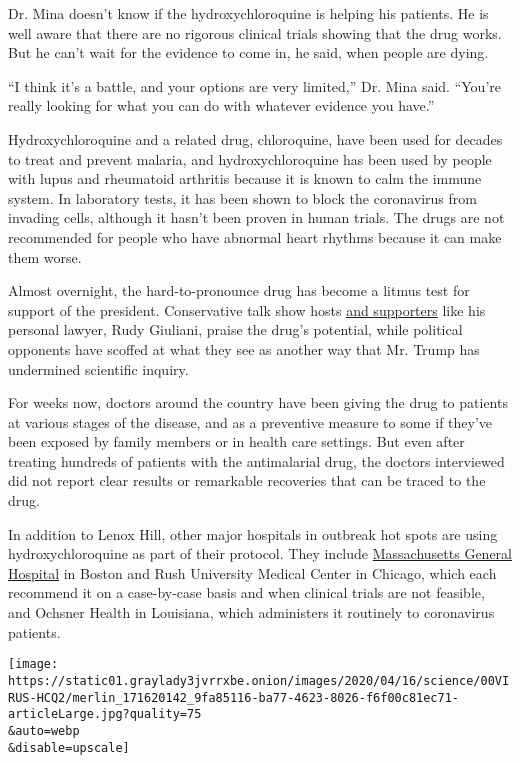Dr. Mina doesn't know if the hydroxychloroquine is helping his patients.
He is well aware that there are no rigorous clinical trials showing that
the drug works. But he can't wait for the evidence to come in, he said,
when people are dying.

``I think it's a battle, and your options are very limited,'' Dr. Mina
said. ``You're really looking for what you can do with whatever evidence
you have.''

Hydroxychloroquine and a related drug, chloroquine, have been used for
decades to treat and prevent malaria, and hydroxychloroquine has been
used by people with lupus and rheumatoid arthritis because it is known
to calm the immune system. In laboratory tests, it has been shown to
block the coronavirus from invading cells, although it hasn't been
proven in human trials. The drugs are not recommended for people who
have abnormal heart rhythms because it can make them worse.

Almost overnight, the hard-to-pronounce drug has become a litmus test
for support of the president. Conservative talk show hosts
\href{https://www.wsj.com/articles/conservative-group-pushes-for-fda-approval-of-drug-to-treat-coronavirus-11585229415?redirect=amp\#click=https://t.co/5rakc6KA4h}{and
supporters} like his personal lawyer, Rudy Giuliani, praise the drug's
potential, while political opponents have scoffed at what they see as
another way that Mr. Trump has undermined scientific inquiry.

For weeks now, doctors around the country have been giving the drug to
patients at various stages of the disease, and as a preventive measure
to some if they've been exposed by family members or in health care
settings. But even after treating hundreds of patients with the
antimalarial drug, the doctors interviewed did not report clear results
or remarkable recoveries that can be traced to the drug.

In addition to Lenox Hill, other major hospitals in outbreak hot spots
are using hydroxychloroquine as part of their protocol. They include
\href{https://www.massgeneral.org/assets/MGH/pdf/news/coronavirus/mass-general-COVID-19-treatment-guidance.pdf}{Massachusetts
General Hospital} in Boston and Rush University Medical Center in
Chicago, which each recommend it on a case-by-case basis and when
clinical trials are not feasible, and Ochsner Health in Louisiana, which
administers it routinely to coronavirus patients.

\texttt{[image: https://static01.graylady3jvrrxbe.onion/images/2020/04/16/science/00VIRUS-HCQ2/merlin\_171620142\_9fa85116-ba77-4623-8026-f6f00c81ec71-articleLarge.jpg?quality=75\\\&auto=webp\\\&disable=upscale]}

